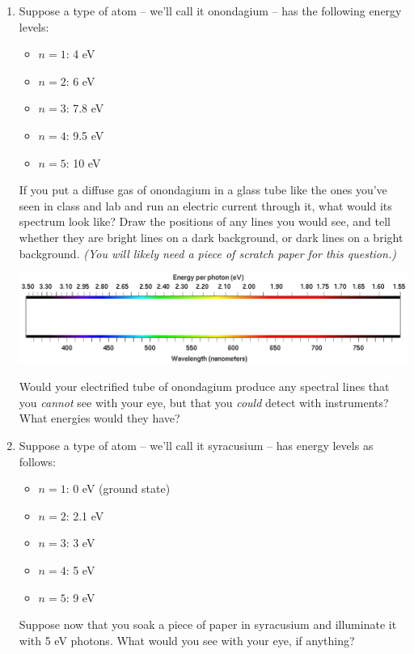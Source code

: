 \documentclass[11pt]{article}
\begin{document}
	\begin{enumerate}
		
		
		\item Suppose a type of atom -- we'll call it onondagium -- has the following energy levels:
		\begin{itemize}
			\item $n=1$: 4 eV
			\item $n=2$: 6 eV
			\item $n=3$: 7.8 eV
			\item $n=4$: 9.5 eV
			\item $n=5$: 10 eV
		\end{itemize}
		
		If you put a diffuse gas of onondagium in a glass tube like the ones you've seen in class and lab and run an electric current through it, what would its spectrum look like? Draw the positions of any lines you would see, and tell whether they are bright lines on a dark background, or dark lines on a bright background. {\it (You will likely need a piece of scratch paper for this question.)}
		
		\includegraphics[width=7in]{spectrum-blank.png}
		\vspace{1in}
		
		Would your electrified tube of onondagium produce any spectral lines that you {\it cannot} see with your eye, but that you {\it could} detect with instruments? What energies would they have?
		
		\newpage
		
		
		\item Suppose a type of atom -- we'll call it syracusium -- has energy levels as follows:
		\begin{itemize}
			\item $n=1$: 0 eV (ground state)
			\item $n=2$: 2.1 eV
			\item $n=3$: 3 eV
			\item $n=4$: 5 eV
			\item $n=5$: 9 eV
		\end{itemize}
		
		Suppose now that you soak a piece of paper in syracusium and illuminate it with 5 eV photons. What would you see with your eye, if anything? 
		

\end{enumerate}
\end{document}
